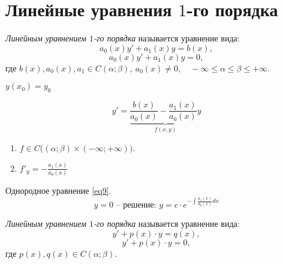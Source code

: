 \section{Линейные уравнения $1$-го порядка}

\begin{definition}
    \emph{Линейным уравнением $1$-го порядка} называется уравнение вида:
    \begin{equation}\label{eq8}
        a_0(x)y' + a_1(x)y = b(x),
    \end{equation}
    \begin{equation}\label{eq9}
        a_0(x)y' + a_1(x)y = 0,
    \end{equation}
    где $b(x), a_0(x),a_1 \in C(\alpha;\beta), \ a_0(x) \ne 0, \quad -\infty \leqslant \alpha \leqslant\beta\leqslant+\infty$.
\end{definition}

\begin{note}
    $y(x_0) = y_0$
\end{note}

\begin{theorem}[$\exists$ и $!$]
    \[
        y' = \underbrace{\frac{b(x)}{a_0(x)} - \frac{a_1(x)}{a_0(x)}y}_{f(x,y)}
    \]
    \begin{enumerate}
        \item $f\in C\big((\alpha;\beta) \times (-\infty;+\infty)\big)$.
        \item $f'_y = -\frac{a_1(x)}{a_0(x)}$
    \end{enumerate}

    Однородное уравнение \ref{eq9}.
    \[
        y = 0\text{ -- решение: }y = c\cdot e^{-\int \frac{a_1(x)}{a_0(x)}dx}
    \]
\end{theorem}

\begin{definition}
    \emph{Линейным уравнением $1$-го порядка} называется уравнение вида:
    \begin{equation}\label{eq10}
        y'+p(x)\cdot y = q(x),
    \end{equation}
    \begin{equation}\label{eq11}
        y' + p(x)\cdot y = 0,
    \end{equation}
    где $p(x),q(x) \in C(\alpha;\beta)$.
\end{definition}

